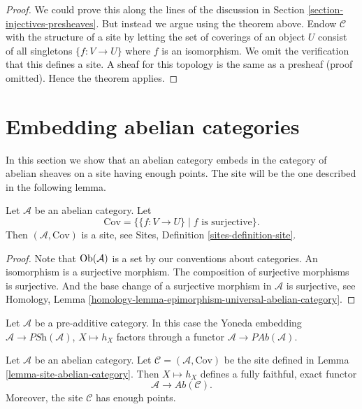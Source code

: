 \begin{proof}
We could prove this along the lines of the discussion in
Section \ref{section-injectives-presheaves}. But instead we argue using the
theorem above. Endow $\mathcal{C}$ with the structure of a site by letting the
set of coverings of an object $U$ consist of all singletons $\{f : V \to U\}$
where $f$ is an isomorphism. We omit the verification that this defines a site.
A sheaf for this topology is the same as a presheaf (proof omitted). Hence the
theorem applies.
\end{proof}








\section{Embedding abelian categories}
\label{section-embedding}

\noindent
In this section we show that an abelian category embeds in the
category of abelian sheaves on a site having enough points.
The site will be the one described in the following lemma.

\begin{lemma}
\label{lemma-site-abelian-category}
Let $\mathcal{A}$ be an abelian category.
Let
$$
\text{Cov} = \{\{f : V \to U\} \mid f\text{ is surjective}\}.
$$
Then $(\mathcal{A}, \text{Cov})$ is a site, see
Sites, Definition \ref{sites-definition-site}.
\end{lemma}

\begin{proof}
Note that $\mathop{\mathrm{Ob}}\nolimits(\mathcal{A})$ is a set by our conventions
about categories. An isomorphism is a surjective morphism.
The composition of surjective morphisms is surjective.
And the base change of a surjective morphism in $\mathcal{A}$
is surjective, see
Homology, Lemma \ref{homology-lemma-epimorphism-universal-abelian-category}.
\end{proof}

\noindent
Let $\mathcal{A}$ be a pre-additive category. In this case the
Yoneda embedding $\mathcal{A} \to \textit{PSh}(\mathcal{A})$, $X \mapsto h_X$
factors through a functor $\mathcal{A} \to \textit{PAb}(\mathcal{A})$.

\begin{lemma}
\label{lemma-embedding}
Let $\mathcal{A}$ be an abelian category.
Let $\mathcal{C} = (\mathcal{A}, \text{Cov})$ be the
site defined in
Lemma \ref{lemma-site-abelian-category}.
Then $X \mapsto h_X$ defines a fully faithful, exact functor
$$
\mathcal{A} \longrightarrow \textit{Ab}(\mathcal{C}).
$$
Moreover, the site $\mathcal{C}$ has enough points.
\end{lemma}

